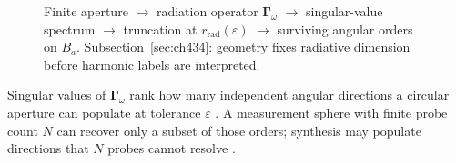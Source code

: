 \begin{figure}[t]
\centering
{}
\caption{Finite aperture $\to$ radiation operator $\boldsymbol{\Gamma}_\omega$ $\to$ singular-value spectrum
$\to$ truncation at $r_{\mathrm{rad}}(\varepsilon)$ $\to$ surviving angular orders on $B_{a}$.
Subsection~\ref{sec:ch434}: geometry fixes radiative dimension before harmonic labels are interpreted.}
\label{fig:ch4.aperture-svd-angular-orders}
\end{figure}
Singular values of $\boldsymbol{\Gamma}_\omega$ rank how many independent angular directions a circular aperture can populate at tolerance $\varepsilon$ \cite{stratton1941}. 
A measurement sphere with finite probe count $N$ can recover only a subset of those orders; synthesis may populate
directions that $N$ probes cannot resolve \cite{harrington2001}.
